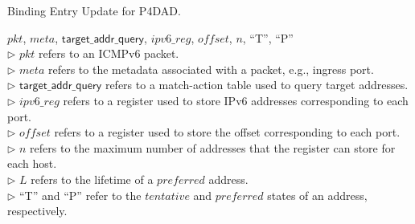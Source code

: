 \documentclass[a4paper,fleqn]{cas-dc}
\begin{document}
        \begin{algorithm}[!t]
        \caption{Binding Entry Update for P4DAD.}
        \label{alg:binding-entry-update}
            \begin{algorithmic}[1]
            \Require $pkt$, $meta$, $\mathsf{target\_addr\_query}$, $ipv6\_reg$, $of\!fset$, $n$, ``T'', ``P''\\
            $\triangleright$ $pkt$ refers to an ICMPv6 packet.\\
            $\triangleright$ $meta$ refers to the metadata associated with a packet, e.g., ingress port.\\
            $\triangleright$ $\mathsf{target\_addr\_query}$ refers to a match-action table used to query target addresses.\\
            $\triangleright$ $ipv6\_reg$ refers to a register used to store IPv6 addresses corresponding to each port.\\
            $\triangleright$ $of\!fset$ refers to a register used to store the offset corresponding to each port.\\
            $\triangleright$ $n$ refers to the maximum number of addresses that the register can store for each host.\\
            $\triangleright$ $L$ refers to the lifetime of a $preferred$ address.\\
            $\triangleright$ ``T'' and ``P'' refer to the $tentative$ and $preferred$ states of an address, respectively.


\end{algorithmic}
\end{algorithm}
\end{document}
